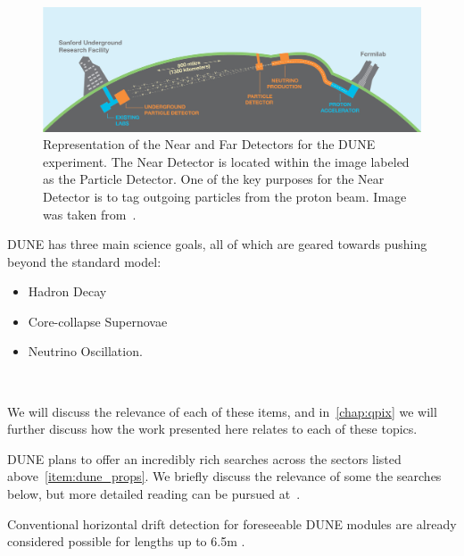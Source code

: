 \begin{figure}[]
\centering
\includegraphics[width=\textwidth]{images/LBNE_Graphic_061615_2016.jpg}
\caption{Representation of the Near and Far Detectors for the DUNE experiment. The Near Detector is located within the image labeled as the Particle Detector. One of the key purposes for the Near Detector is to tag outgoing particles from the proton beam. Image was taken from~\citep{dune_cdr_2016_arxiv}.}
\end{figure}

DUNE has three main science goals, all of which are geared towards pushing beyond the standard model:
\begin{itemize}
    \item Hadron Decay
    \item Core-collapse Supernovae
    \item Neutrino Oscillation.
\end{itemize}
~\label{item:dune_props}

We will discuss the relevance of each of these items, and in~\ref{chap:qpix} we will further discuss how the work presented here relates to each of these topics.

DUNE plans to offer an incredibly rich searches across the sectors listed above~\ref{item:dune_props}.
We briefly discuss the relevance of some the searches below, but more detailed reading can be pursued at~\citep{DUNE_FD_TDRv2_2020}.

Conventional horizontal drift detection for foreseeable DUNE modules are already considered possible for lengths up to 6.5m \citep{DUNE_Vertical:Paulucci_2022}.
